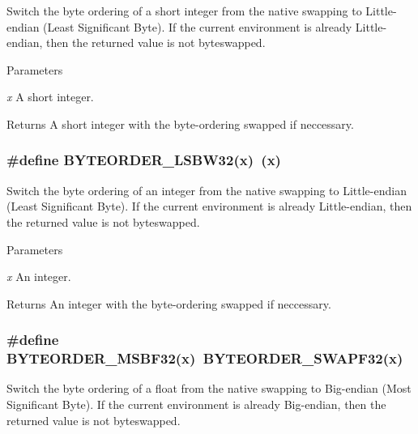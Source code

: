 Switch the byte ordering of a short integer from the native swapping to Little-\/endian (Least Significant Byte). If the current environment is already Little-\/endian, then the returned value is not byteswapped.


\begin{DoxyParams}{Parameters}
\item[{\em x}]A short integer. \end{DoxyParams}
\begin{DoxyReturn}{Returns}
A short integer with the byte-\/ordering swapped if neccessary. 
\end{DoxyReturn}
\hypertarget{group__byteorder_ga24bb3ddfe733a3202d53a0d14f186105}{
\subsubsection[{BYTEORDER\_\-LSBW32}]{\setlength{\rightskip}{0pt plus 5cm}\#define BYTEORDER\_\-LSBW32(x)~(x)}}
\label{group__byteorder_ga24bb3ddfe733a3202d53a0d14f186105}


Switch the byte ordering of an integer from the native swapping to Little-\/endian (Least Significant Byte). If the current environment is already Little-\/endian, then the returned value is not byteswapped.


\begin{DoxyParams}{Parameters}
\item[{\em x}]An integer. \end{DoxyParams}
\begin{DoxyReturn}{Returns}
An integer with the byte-\/ordering swapped if neccessary. 
\end{DoxyReturn}
\hypertarget{group__byteorder_gaa5783a6ed7c7d471150da5a9c5453f79}{
\subsubsection[{BYTEORDER\_\-MSBF32}]{\setlength{\rightskip}{0pt plus 5cm}\#define BYTEORDER\_\-MSBF32(x)~BYTEORDER\_\-SWAPF32(x)}}
\label{group__byteorder_gaa5783a6ed7c7d471150da5a9c5453f79}


Switch the byte ordering of a float from the native swapping to Big-\/endian (Most Significant Byte). If the current environment is already Big-\/endian, then the returned value is not byteswapped.


